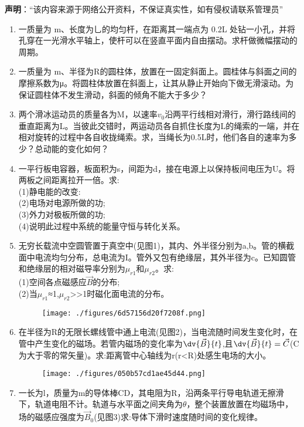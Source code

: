 


\textbf{声明}：“该内容来源于网络公开资料，不保证真实性，如有侵权请联系管理员”

\begin{enumerate}
\item 一质量为 m、长度为乚的均匀杆，在距离其一端点为 0.2L 处钻一小孔，并将孔穿在一光滑水平轴上，使杆可以在竖直平面内自由摆动。求杆做微幅摆动的周期。
\item 一质量为 m、半径为R的圆柱体，放置在一固定斜面上。圆桂体与斜面之间的摩擦系数为μ。将圆柱体放置在斜面上，让其从静止开始向下做无滑滚动。为保证圆柱体不发生滑动，斜面的倾角不能大于多少？
\item 两个滑冰运动员的质量各为M，以速率$v_0$沿两平行线相对滑行，滑行路线间的垂直距离为L。当彼此交错时，两运动员各自抓住长度为L的绳索的一端，并在相对旋转的过程中各自收拢绳索。求，当绳长为0.5L时，他们各自的速率为多少？总动能的变化如何？
\item 一平行板电容器，板面积为s，间距为d，接在电源上以保持板间电压为U。将两板之间距离拉开一倍。求:\\(1)静电能的改变:\\(2)电场对电源所做的功;\\(3)外力对极板所做的功;\\(4)说明此过程中系统的能量守恒与转化关系。
\item 无穷长载流中空圆管置于真空中(见图1)，其内、外半径分别为a,b。管的横截面中电流均匀分布，总电流为I。管外又包有绝缘层，其外半径为c。已知圆管和绝缘层的相对磁导率分别为$\mu_{r1}$和$\mu_{r2}$。求:\\
(1)空间各点磁感应$\vec B$的分布;\\
(2)当$\mu_{r1}$≈1,$\mu_{r2}$>>1时磁化面电流的分布。
\begin{figure}[ht]
\centering
\texttt{[image: ./figures/6d57156d20f7208f.png]}
\caption{} \label{fig_SSD05_2}
\end{figure}
\item 在半径为R的无限长螺线管中通上电流(见图2)，当电流随时间发生变化时，在管中产生变化的磁场。若管内磁场的变化率为$\displaystyle \dv{\vec B}{t}$,且$\displaystyle \dv{\vec B}{t}=\vec C$(\vec C为大于零的常矢量)。求:距离管中心轴线为r(r<R)处感生电场的大小。
\begin{figure}[ht]
\centering
\texttt{[image: ./figures/050b57cd1ae45d44.png]}
\caption{} \label{fig_SSD05_4}
\end{figure}
\item 一长为l，质量为m的导体棒CD，其电阻为R，沿两条平行导电轨道无擦滑下，轨道电阻不计。轨道与水平面之间夹角为$\theta $，整个装置放置在均磁场中，场的磁感应强度为$\vec B_0$(见图3)求:导体下滑时速度随时间的变化规律。

\end{enumerate}
